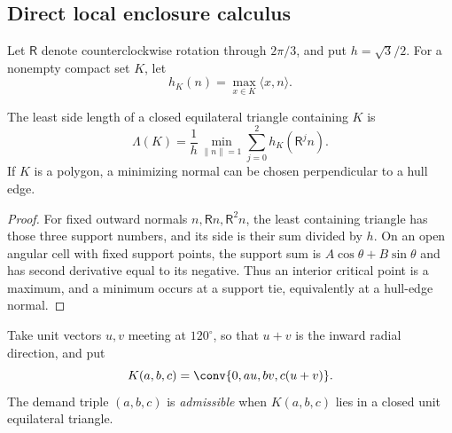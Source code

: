 \subsection{Direct local enclosure calculus}
\label{subsec:direct-local-calculus}

Let $\mathsf R$ denote counterclockwise rotation through $2\pi/3$, and put
$h=\sqrt3/2$.  For a nonempty compact set $K$, let
\[
 h_K(n)=\max_{x\in K}\langle x,n\rangle .
\]

\begin{proposition}
\label{prop:new-enclosure-gauge}
\label{prop:universal-enclosure-gauge}
The least side length of a closed equilateral triangle containing $K$ is
\[
 \Lambda(K)=\frac1h\min_{\lVert n\rVert=1}
 \sum_{j=0}^2h_K(\mathsf R^jn).
 \tag{6.1}
\]
If $K$ is a polygon, a minimizing normal can be chosen perpendicular to a
hull edge.
\end{proposition}

\begin{proof}
For fixed outward normals $n,\mathsf Rn,\mathsf R^2n$, the least containing
triangle has those three support numbers, and its side is their sum divided
by $h$.  On an open angular cell with fixed support points, the support sum is
$A\cos\theta+B\sin\theta$ and has second derivative equal to its negative.
Thus an interior critical point is a maximum, and a minimum occurs at a
support tie, equivalently at a hull-edge normal.
\end{proof}

Take unit vectors $u,v$ meeting at $120^\circ$, so that $u+v$ is the inward
radial direction, and put
\[
 K(a,b,c)=\conv\{0,au,bv,c(u+v)\}.
\]
The demand triple $(a,b,c)$ is \emph{admissible} when $K(a,b,c)$ lies in a
closed unit equilateral triangle.

